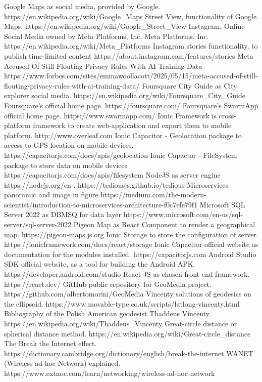 \documentclass[conference]{IEEEtran}
\begin{document}
\begin{thebibliography}{00}
 Google Maps as social media, provided by Google. https://en.wikipedia.org/wiki/Google\_Maps
 Street View, functionality of Google Maps.
https://en.wikipedia.org/wiki/Google\_Street\_View
 Instagram, Online Social Media owned by Meta Platforms, Inc.
 Meta Platforms, Inc.
https://en.wikipedia.org/wiki/Meta\_Platforms
 Instagram stories functionality, to publish time-limited content
https://about.instagram.com/features/stories
Meta Accused Of Still Flouting Privacy Rules With AI Training Data
https://www.forbes.com/sites/emmawoollacott/2025/05/15/meta-accused-of-still-flouting-privacy-rules-with-ai-training-data/
 Foursquare City Guide as City explorer social media.
https://en.wikipedia.org/wiki/Foursquare\_City\_Guide
 Foursquare's official home page.
https://foursquare.com/
 Foursquare's SwarmApp official home page.
https://www.swarmapp.com/
 Ionic Framework is cross-platform framework to create web-application and export them to mobile platform. http://www.overleaf.com
 Ionic Capacitor - Geolocation package to access to GPS location on mobile devices. https://capacitorjs.com/docs/apis/geolocation
Ionic Capactor - FileSystem package to store data on mobile devices https://capacitorjs.com/docs/apis/filesystem
 NodeJS as server engine https://nodejs.org/en
. https://tediousjs.github.io/tedious
 Microservices panoramic and image in figure https://medium.com/the-modern-scientist/introduction-to-microservices-architecture-f0c7efe79f1
 Microsoft SQL Server 2022 as DBMSQ for data layer https://www.microsoft.com/en-us/sql-server/sql-server-2022
 Pigeon Map as React Component to render a geographical map. https://pigeon-maps.js.org
Ionic Storage to store the configuration of server. https://ionicframework.com/docs/react/storage
Ionic Capacitor official website as documentation for the modules installed. https://capacitorjs.com
Android Studio SDK official website, as a tool for building the Android APK. https://developer.android.com/studio
React JS as chosen front-end framework. https://react.dev/
GitHub public repository for GeoMedia project. https://github.com/albertomorini/GeoMedia
 Vincenty solutions of geodesics on the ellipsoid. 
https://www.movable-type.co.uk/scripts/latlong-vincenty.html
 Bibliography of the Polish American geodesist Thaddeus Vincenty. https://en.wikipedia.org/wiki/Thaddeus\_Vincenty
Great-circle distance or spherical distance method.
https://en.wikipedia.org/wiki/Great-circle\_distance
 The Break the Internet effect. 
\\
https://dictionary.cambridge.org/dictionary/english/break-the-internet
 WANET (Wireless ad hoc Network) explained.
https://www.extnoc.com/learn/networking/wireless-ad-hoc-network
\end{thebibliography}

\vspace{12pt}
\end{document}
